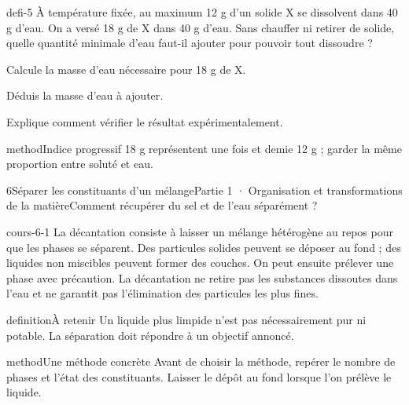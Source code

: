 \documentclass[12pt,twoside,openany]{book}
\begin{document}
\label{defi-ex-5}
\begin{pcFiche}{defi-5}
À température fixée, au maximum 12 g d’un solide X se dissolvent dans 40 g d’eau. On a versé 18 g de X dans 40 g d’eau. Sans chauffer ni retirer de solide, quelle quantité minimale d’eau faut-il ajouter pour pouvoir tout dissoudre ?\par
{}
\begin{questions}
\item Calcule la masse d’eau nécessaire pour 18 g de X.
\item Déduis la masse d’eau à ajouter.
\item Explique comment vérifier le résultat expérimentalement.
\end{questions}
\begin{pcEncadre}{method}{Indice progressif}
18 g représentent une fois et demie 12 g ; garder la même proportion entre soluté et eau.\par
\end{pcEncadre}
\end{pcFiche}
\clearpage\pagestyle{otMain}
\begin{ouverture}[college1]{6}{Séparer les constituants d’un mélange}{Partie 1 · Organisation et transformations de la matière}{Comment récupérer du sel et de l’eau séparément ?}
\end{ouverture}
\label{ch-6-cours-1}
\label{ess-6}
\begin{pcFiche}{cours-6-1}
La décantation consiste à laisser un mélange hétérogène au repos pour que les phases se séparent. Des particules solides peuvent se déposer au fond ; des liquides non miscibles peuvent former des couches. On peut ensuite prélever une phase avec précaution. La décantation ne retire pas les substances dissoutes dans l’eau et ne garantit pas l’élimination des particules les plus fines.\par
{}
\begin{pcEncadre}{definition}{À retenir}
Un liquide plus limpide n’est pas nécessairement pur ni potable. La séparation doit répondre à un objectif annoncé.\par
\end{pcEncadre}
\begin{pcEncadre}{method}{Une méthode concrète}
Avant de choisir la méthode, repérer le nombre de phases et l’état des constituants. Laisser le dépôt au fond lorsque l’on prélève le liquide.\par
\end{pcEncadre}
\end{pcFiche}
\end{document}
